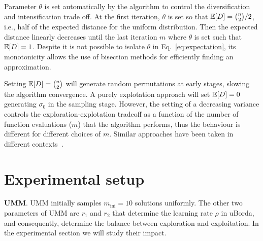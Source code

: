 \documentclass[sigconf,dvipsnames]{acmart}
\DeclareMathOperator*{\argmax}{arg\,max}
\newcommand{\minit}{\ensuremath{m_\text{ini}}\xspace}
\begin{document}
Parameter $\theta$ is set automatically by the algorithm to control the diversification and intensification trade off. At the first iteration, $\theta$ is set so that  $\mathbb{E}[D] = \binom{n}{2} / 2$, i.e., half of the expected distance for the uniform distribution. 
Then the expected distance linearly decreases until the last iteration $m$ where $\theta$ is set such that $\mathbb{E}[D] = 1$. Despite it is not possible to isolate $\theta$ in Eq.~\eqref{eq:expectation}, its monotonicity allows the use of bisection methods for efficiently finding an approximation. 

Setting $\mathbb{E}[D] = \binom{n}{2}$ will generate random permutations at early stages, slowing the algorithm convergence. 
A purely explotation approach will set $\mathbb{E}[D] = 0$  generating $\sigma_0$ in the sampling stage. However, the setting of a decreasing variance   controls the exploration-explotation tradeoff as a function of the number of function evaluations ($m$) that the algorithm performs, thus the behaviour is different for different choices of $m$. Similar approaches have been taken in different contexts~\cite{ArzCebPer2019qap}. 







\newcommand{\myparagraph}[1]{\smallskip{}\noindent\textbf{#1}.}


\section{Experimental setup}\label{sec:setup}

\myparagraph{UMM}
%
UMM initially samples $\minit=10$ solutions uniformly.
The other two parameters of UMM are $r_1$ and $r_2$ that determine the learning rate $\rho$ in uBorda, and consequently, determine the
balance between exploration and exploitation. In the experimental section we
will study their impact.
\end{document}
